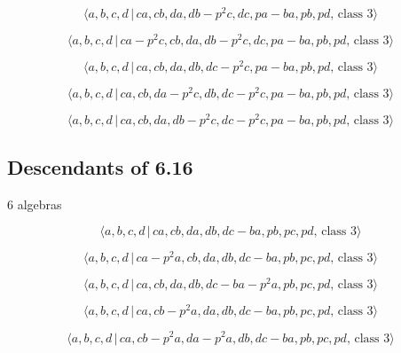 \documentclass[10pt]{article}
\begin{document}
\begin{equation}
\langle a,b,c,d\,|\,ca,cb,da,db-p^2c,dc,pa-ba,pb,pd,\,\text{class }3\rangle 
\tag{7.3709}
\end{equation}

\begin{equation}
\langle a,b,c,d\,|\,ca-p^2c,cb,da,db-p^2c,dc,pa-ba,pb,pd,\,\text{class }%
3\rangle  \tag{7.3710}
\end{equation}

\begin{equation}
\langle a,b,c,d\,|\,ca,cb,da,db,dc-p^2c,pa-ba,pb,pd,\,\text{class }3\rangle 
\tag{7.3711}
\end{equation}

\begin{equation}
\langle a,b,c,d\,|\,ca,cb,da-p^2c,db,dc-p^2c,pa-ba,pb,pd,\,\text{class }%
3\rangle  \tag{7.3712}
\end{equation}

\begin{equation}
\langle a,b,c,d\,|\,ca,cb,da,db-p^2c,dc-p^2c,pa-ba,pb,pd,\,\text{class }%
3\rangle  \tag{7.3713}
\end{equation}

\subsection{Descendants of 6.16}

6 algebras

\begin{equation}
\langle a,b,c,d\,|\,ca,cb,da,db,dc-ba,pb,pc,pd,\,\text{class }3\rangle 
\tag{7.3714}
\end{equation}

\begin{equation}
\langle a,b,c,d\,|\,ca-p^2a,cb,da,db,dc-ba,pb,pc,pd,\,\text{class }3\rangle 
\tag{7.3715}
\end{equation}

\begin{equation}
\langle a,b,c,d\,|\,ca,cb,da,db,dc-ba-p^2a,pb,pc,pd,\,\text{class }3\rangle 
\tag{7.3716}
\end{equation}

\begin{equation}
\langle a,b,c,d\,|\,ca,cb-p^2a,da,db,dc-ba,pb,pc,pd,\,\text{class }3\rangle 
\tag{7.3717}
\end{equation}

\begin{equation}
\langle a,b,c,d\,|\,ca,cb-p^2a,da-p^2a,db,dc-ba,pb,pc,pd,\,\text{class }%
3\rangle  \tag{7.3718}
\end{equation}
\end{document}
